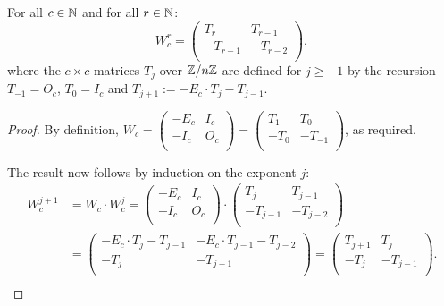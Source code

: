 \begin{lemma}\label{lem_struc}
  For all $c\in\mathbb{N}$ and for all $r\in\mathbb{N}$:
  \[
  W_{c}^{r}
  =
  \left(
  \begin{array}{cc}
     T_{r} &  T_{r-1} \\
    -T_{r-1} & -T_{r-2}   \\
  \end{array}
  \right),
  \]
  where the $c\times c$-matrices $T_j$ over $\mathbb{Z}/n\mathbb{Z}$ are defined for
$j\geq -1$ by the recursion $T_{-1}=O_c$, $T_0=I_c$ and $T_{j+1} := -E_c \cdot T_{j} - T_{j-1}.$
\end{lemma}

\begin{proof}
By definition,
$W_{c}= \left(\begin{smallmatrix} -E_c & I_c \\ -I_c & O_c \\\end{smallmatrix}\right) = \left(\begin{smallmatrix} T_{1} & T_{0} \\ -T_{0} & -T_{-1} \\\end{smallmatrix}\right)$, as required.

The result now follows by induction on the exponent $j$:
  \[
  \begin{aligned}
  W_{c}^{j+1}
  & = W_{c} \cdot W_{c}^{j} 
  =
  \left(
  \begin{array}{cc}
    -E_c & I_c \\
    -I_c & O_c \\
  \end{array}
  \right)
  \cdot
  \left(
  \begin{array}{cc}
     T_{j} &  T_{j-1}  \\
    -T_{j-1} & -T_{j-2} \\
  \end{array}
  \right) \\
  & =
  \left(
  \begin{array}{cc}
    -E_c \cdot T_{j} - T_{j-1} & -E_c \cdot T_{j-1} - T_{j-2} \\
    -T_{j}                  & -T_{j-1}                  \\
  \end{array}
  \right) 
  =
  \left(
  \begin{array}{cc}
     T_{j+1} &  T_{j} \\
    -T_{j} & -T_{j-1} \\
  \end{array}
  \right). \\
  \end{aligned}
  \]
\end{proof}
%
